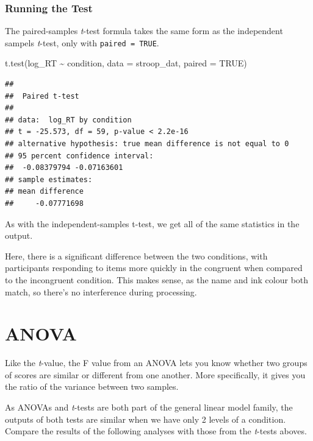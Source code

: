 \documentclass[
]{book}
\newenvironment{Shaded}{\begin{snugshade}}{\end{snugshade}}
\newcommand{\AttributeTok}[1]{\textcolor[rgb]{0.77,0.63,0.00}{#1}}
\newcommand{\ConstantTok}[1]{\textcolor[rgb]{0.00,0.00,0.00}{#1}}
\newcommand{\FunctionTok}[1]{\textcolor[rgb]{0.00,0.00,0.00}{#1}}
\newcommand{\NormalTok}[1]{#1}
\newcommand{\SpecialCharTok}[1]{\textcolor[rgb]{0.00,0.00,0.00}{#1}}
\begin{document}
\hypertarget{running-the-test-2}{%
\subsubsection{Running the Test}\label{running-the-test-2}}

The paired-samples \emph{t}-test formula takes the same form as the independent sampels \emph{t}-test, only with \texttt{paired\ =\ TRUE}.

\begin{Shaded}
\begin{Highlighting}[]
\FunctionTok{t.test}\NormalTok{(log\_RT }\SpecialCharTok{\textasciitilde{}}\NormalTok{ condition, }\AttributeTok{data =}\NormalTok{ stroop\_dat, }\AttributeTok{paired =} \ConstantTok{TRUE}\NormalTok{)}
\end{Highlighting}
\end{Shaded}

\begin{verbatim}
## 
##  Paired t-test
## 
## data:  log_RT by condition
## t = -25.573, df = 59, p-value < 2.2e-16
## alternative hypothesis: true mean difference is not equal to 0
## 95 percent confidence interval:
##  -0.08379794 -0.07163601
## sample estimates:
## mean difference 
##     -0.07771698
\end{verbatim}

As with the independent-samples t-test, we get all of the same statistics in the output.

Here, there is a significant difference between the two conditions, with participants responding to items more quickly in the congruent when compared to the incongruent condition. This makes sense, as the name and ink colour both match, so there's no interference during processing.

\hypertarget{anova}{%
\section{ANOVA}\label{anova}}

Like the \emph{t}-value, the F value from an ANOVA lets you know whether two groups of scores are similar or different from one another. More specifically, it gives you the ratio of the variance between two samples.

As ANOVAs and \emph{t}-tests are both part of the general linear model family, the outputs of both tests are similar when we have only 2 levels of a condition. Compare the results of the following analyses with those from the \emph{t}-tests aboves.
\end{document}
